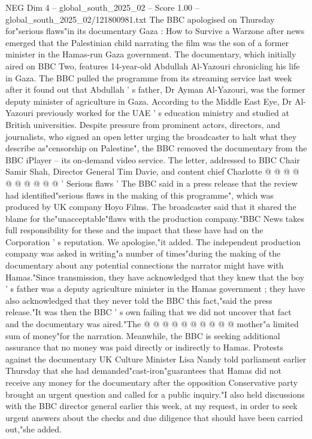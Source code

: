 \begin{textsample}{NEG Dim 4 – global\_south\_2025\_02 – Score 1.00 – global\_south\_2025\_02/121800981.txt}  \label{ex:f4_neg_431}
The BBC apologised on Thursday for"serious flaws"in its documentary Gaza : How to Survive a Warzone after news emerged that the Palestinian child narrating the film was the son of a former minister in the Hamas-run Gaza government.
The documentary, which initially aired on BBC Two, features 14-year-old Abdullah Al-Yazouri chronicling his life in Gaza.
The BBC pulled the programme from its streaming service last week after it found out that Abdullah ' s father, Dr Ayman Al-Yazouri, was the former deputy minister of agriculture in Gaza.
According to the Middle East Eye, Dr Al-Yazouri previously worked for the UAE ' s education ministry and studied at British universities.
Despite pressure from prominent actors, directors, and journalists, who signed an open letter urging the broadcaster to halt what they describe as"censorship on Palestine", the BBC removed the documentary from the BBC iPlayer -- its on-demand video service.
The letter, addressed to BBC Chair Samir Shah, Director General Tim Davie, and content chief Charlotte @ @ @ @ @ @ @ @ @ @ ' Serious flaws ' The BBC said in a press release that the review had identified"serious flaws in the making of this programme", which was produced by UK company Hoyo Films.
The broadcaster said that it shared the blame for the"unacceptable"flaws with the production company."BBC News takes full responsibility for these and the impact that these have had on the Corporation ' s reputation.
We apologise,"it added.
The independent production company was asked in writing"a number of times"during the making of the documentary about any potential connections the narrator might have with Hamas."Since transmission, they have acknowledged that they knew that the boy ' s father was a deputy agriculture minister in the Hamas government ; they have also acknowledged that they never told the BBC this fact,"said the press release."It was then the BBC ' s own failing that we did not uncover that fact and the documentary was aired."The @ @ @ @ @ @ @ @ @ @ mother"a limited sum of money"for the narration.
Meanwhile, the BBC is seeking additional assurance that no money was paid directly or indirectly to Hamas.
Protests against the documentary UK Culture Minister Lisa Nandy told parliament earlier Thursday that she had demanded"cast-iron"guarantees that Hamas did not receive any money for the documentary after the opposition Conservative party brought an urgent question and called for a public inquiry."I also held discussions with the BBC director general earlier this week, at my request, in order to seek urgent answers about the checks and due diligence that should have been carried out,"she added.

\end{textsample}
